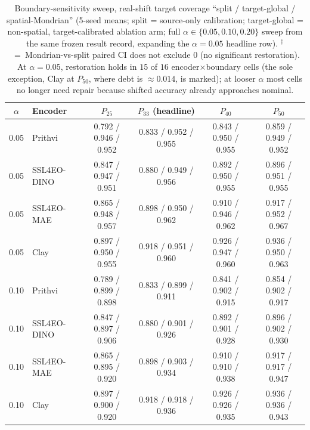 \documentclass[journal]{IEEEtran}
\renewcommand{\_}{\textunderscore\allowbreak}
\begin{document}
\begin{table}[htbp]\centering\small
\caption{Boundary-sensitivity sweep, real-shift target coverage ``split / target-global /
spatial-Mondrian'' (5-seed means; split = source-only calibration; target-global = non-spatial,
target-calibrated ablation arm; full $\alpha\in\{0.05,0.10,0.20\}$ sweep from the same frozen result
record, expanding the $\alpha{=}0.05$ headline row). $^{\dagger}$~=~Mondrian-vs-split paired CI does not
exclude $0$ (no significant restoration). At $\alpha{=}0.05$, restoration holds in $15$ of $16$
encoder$\times$boundary cells (the sole exception, Clay at $P_{50}$, where debt is ${\approx}0.014$, is
marked); at looser $\alpha$ most cells no longer need repair because shifted accuracy already approaches
nominal.}\label{tab:boundary}
\begin{tabular}{clcccc}
\toprule
$\alpha$ & Encoder & $P_{25}$ & $P_{33}$ (headline) & $P_{40}$ & $P_{50}$ \\
\midrule
0.05 & Prithvi & 0.792 / 0.946 / 0.952 & 0.833 / 0.952 / 0.955 & 0.843 / 0.950 / 0.955 & 0.859 / 0.949 / 0.952 \\
0.05 & SSL4EO-DINO & 0.847 / 0.947 / 0.951 & 0.880 / 0.949 / 0.956 & 0.892 / 0.950 / 0.955 & 0.896 / 0.951 / 0.955 \\
0.05 & SSL4EO-MAE & 0.865 / 0.948 / 0.957 & 0.898 / 0.950 / 0.962 & 0.910 / 0.946 / 0.962 & 0.917 / 0.952 / 0.967 \\
0.05 & Clay & 0.897 / 0.950 / 0.955 & 0.918 / 0.951 / 0.960 & 0.926 / 0.947 / 0.960 & 0.936 / 0.950 / 0.963\rlap{$^{\dagger}$} \\
\midrule
0.10 & Prithvi & 0.789 / 0.899 / 0.898 & 0.833 / 0.899 / 0.911 & 0.841 / 0.902 / 0.915 & 0.854 / 0.902 / 0.917 \\
0.10 & SSL4EO-DINO & 0.847 / 0.897 / 0.906 & 0.880 / 0.901 / 0.926\rlap{$^{\dagger}$} & 0.892 / 0.901 / 0.928\rlap{$^{\dagger}$} & 0.896 / 0.902 / 0.930\rlap{$^{\dagger}$} \\
0.10 & SSL4EO-MAE & 0.865 / 0.895 / 0.920\rlap{$^{\dagger}$} & 0.898 / 0.903 / 0.934\rlap{$^{\dagger}$} & 0.910 / 0.910 / 0.938\rlap{$^{\dagger}$} & 0.917 / 0.917 / 0.947\rlap{$^{\dagger}$} \\
0.10 & Clay & 0.897 / 0.900 / 0.920\rlap{$^{\dagger}$} & 0.918 / 0.918 / 0.936\rlap{$^{\dagger}$} & 0.926 / 0.926 / 0.935\rlap{$^{\dagger}$} & 0.936 / 0.936 / 0.943\rlap{$^{\dagger}$} \\

\end{tabular}
\end{table}
\end{document}
